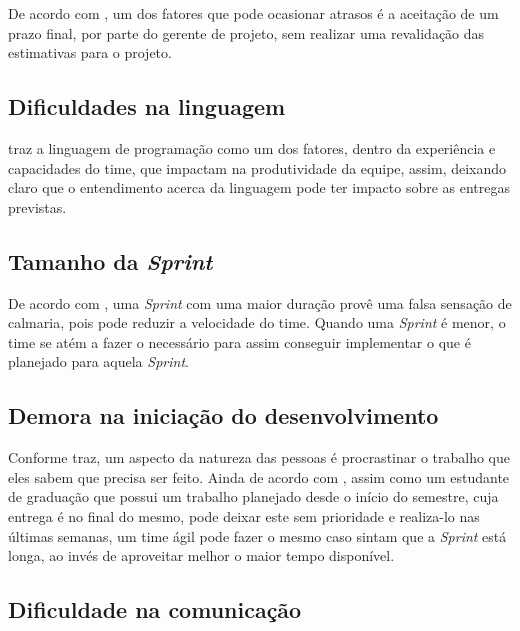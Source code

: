   De acordo com \cite{leo2013}, um dos fatores que pode ocasionar atrasos é a aceitação de um prazo final, por parte do gerente
  de projeto, sem realizar uma revalidação das estimativas para o projeto.

  \subsection{Dificuldades na linguagem}
  
  \cite{melo2011} traz a linguagem de programação como um dos fatores, dentro da experiência e capacidades do time, que impactam
  na produtividade da equipe, assim, deixando claro que o entendimento acerca da linguagem pode ter impacto sobre as entregas 
  previstas.
  
  \subsection{Tamanho da \textit{Sprint}}
  
  De acordo com \cite{cogn2011}, uma \textit{Sprint} com uma maior duração provê uma falsa sensação de calmaria, pois pode reduzir
  a velocidade do time. Quando uma \textit{Sprint} é menor, o time se atém a fazer o necessário para assim conseguir implementar
  o que é planejado para aquela \textit{Sprint}.
  
  
  \subsection{Demora na iniciação do desenvolvimento}
  
  Conforme \cite{cogn2011} traz, um aspecto da natureza das pessoas é procrastinar o trabalho que eles sabem que precisa ser
  feito. Ainda de acordo com \cite{cogn2011}, assim como um estudante de graduação que possui um trabalho planejado desde o início do semestre, cuja entrega é no 
  final do mesmo, pode deixar este sem prioridade e realiza-lo nas últimas semanas, um time ágil pode fazer o mesmo caso sintam
  que a \textit{Sprint} está longa, ao invés de aproveitar melhor o maior tempo disponível.
  
  \subsection{Dificuldade na comunicação}
  
